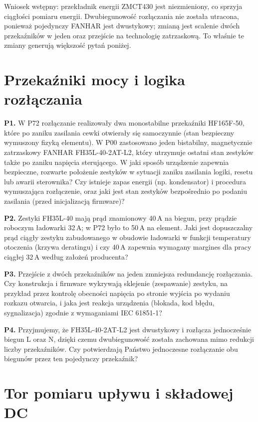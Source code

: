 \documentclass[11pt]{article}
\newcommand{\pyt}[1]{\textbf{\color{navy}#1}\hspace{0.4em}}
\begin{document}
\vspace{2pt}
Wniosek wstępny: przekładnik energii ZMCT430 jest niezmieniony, co sprzyja ciągłości pomiaru energii. Dwubiegunowość rozłączania nie została utracona, ponieważ pojedynczy FANHAR jest dwustykowy; zmianą jest scalenie dwóch przekaźników w jeden oraz przejście na technologię zatrzaskową. To właśnie te zmiany generują większość pytań poniżej.

\section{Przekaźniki mocy i logika rozłączania}

\pyt{P1.} W P72 rozłączanie realizowały dwa monostabilne przekaźniki HF165F-50, które po zaniku zasilania cewki otwierały się samoczynnie (stan bezpieczny wymuszony fizyką elementu). W P00 zastosowano jeden bistabilny, magnetycznie zatrzaskowy FANHAR FH35L-40-2AT-L2, który utrzymuje ostatni stan zestyków także po zaniku napięcia sterującego. W jaki sposób urządzenie zapewnia bezpieczne, rozwarte położenie zestyków w sytuacji zaniku zasilania logiki, resetu lub awarii sterownika? Czy istnieje zapas energii (np. kondensator) i procedura wymuszająca rozłączenie, oraz jaki jest stan zestyków bezpośrednio po podaniu zasilania (przed inicjalizacją firmware)?

\pyt{P2.} Zestyki FH35L-40 mają prąd znamionowy 40\,A na biegun, przy prądzie roboczym ładowarki 32\,A; w P72 było to 50\,A na element. Jaki jest dopuszczalny prąd ciągły zestyku zabudowanego w obudowie ładowarki w funkcji temperatury otoczenia (krzywa deratingu) i czy 40\,A zapewnia wymagany margines dla pracy ciągłej 32\,A według założeń producenta?

\pyt{P3.} Przejście z dwóch przekaźników na jeden zmniejsza redundancję rozłączania. Czy konstrukcja i firmware wykrywają sklejenie (zespawanie) zestyku, na przykład przez kontrolę obecności napięcia po stronie wyjścia po wydaniu rozkazu otwarcia, i jaka jest reakcja urządzenia (blokada, kod błędu, sygnalizacja) zgodnie z wymaganiami IEC 61851-1?

\pyt{P4.} Przyjmujemy, że FH35L-40-2AT-L2 jest dwustykowy i rozłącza jednocześnie biegun L oraz N, dzięki czemu dwubiegunowość została zachowana mimo redukcji liczby przekaźników. Czy potwierdzają Państwo jednoczesne rozłączanie obu biegunów przez ten pojedynczy przekaźnik?

\section{Tor pomiaru upływu i składowej DC}
\end{document}
